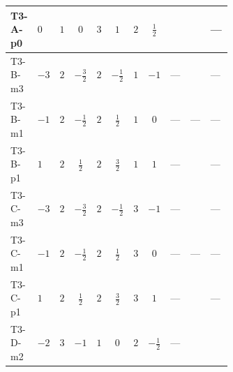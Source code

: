 \documentclass[8pt]{article}
\begin{document}
\begin{landscape}
\begin{longtable}{@{}llcccccc >{\raggedright\arraybackslash}p{0.21\linewidth} >{\raggedright\arraybackslash}p{0.21\linewidth} >{\raggedright\arraybackslash}p{0.21\linewidth}@{}}
\midrule
T3-A-p0 & $0$ & $1$ & $0$ & $3$ & $1$ & $2$ & $\frac{1}{2}$ & \scriptsize\adjustbox{max width=\linewidth}{$\begin{gathered} {m_1^2} (4 T_{\nu}^{(1)}+4 {\lambda_{S_1}^{(1)}})\end{gathered}$} & \scriptsize\adjustbox{max width=\linewidth}{$\begin{gathered} -8 \operatorname{Tr}\!\left({M_F}\,\left({M_F}\right)^{\dagger}\,\left({y_1}\right)^{T}\,\left({y_1}\right)^{*}\right)\end{gathered}$} & --- \\
\midrule
T3-B-m3 & $-3$ & $2$ & $-\frac{3}{2}$ & $2$ & $-\frac{1}{2}$ & $1$ & $-1$ & --- & \scriptsize\adjustbox{max width=\linewidth}{$\begin{gathered} -4 \operatorname{Tr}\!\left({M_F}\,\left({M_F}\right)^{\dagger}\,\left({y_1}\right)^{T}\,\left({y_1}\right)^{*}\right)\end{gathered}$} & --- \\
\midrule
T3-B-m1 & $-1$ & $2$ & $-\frac{1}{2}$ & $2$ & $\frac{1}{2}$ & $1$ & $0$ & --- & --- & --- \\
\midrule
T3-B-p1 & $1$ & $2$ & $\frac{1}{2}$ & $2$ & $\frac{3}{2}$ & $1$ & $1$ & --- & \scriptsize\adjustbox{max width=\linewidth}{$\begin{gathered} -4 \operatorname{Tr}\!\left({M_F}\,\left({M_F}\right)^{\dagger}\,\left({y_1}\right)^{T}\,\left({y_1}\right)^{*}\right)\end{gathered}$} & --- \\
\midrule
T3-C-m3 & $-3$ & $2$ & $-\frac{3}{2}$ & $2$ & $-\frac{1}{2}$ & $3$ & $-1$ & --- & \scriptsize\adjustbox{max width=\linewidth}{$\begin{gathered} -6 \operatorname{Tr}\!\left({M_F}\,\left({M_F}\right)^{\dagger}\,\left({y_1}\right)^{T}\,\left({y_1}\right)^{*}\right)\end{gathered}$} & --- \\
\midrule
T3-C-m1 & $-1$ & $2$ & $-\frac{1}{2}$ & $2$ & $\frac{1}{2}$ & $3$ & $0$ & --- & --- & --- \\
\midrule
T3-C-p1 & $1$ & $2$ & $\frac{1}{2}$ & $2$ & $\frac{3}{2}$ & $3$ & $1$ & --- & \scriptsize\adjustbox{max width=\linewidth}{$\begin{gathered} -6 \operatorname{Tr}\!\left({M_F}\,\left({M_F}\right)^{\dagger}\,\left({y_1}\right)^{T}\,\left({y_1}\right)^{*}\right)\end{gathered}$} & --- \\
\midrule
T3-D-m2 & $-2$ & $3$ & $-1$ & $1$ & $0$ & $2$ & $-\frac{1}{2}$ & --- & \scriptsize\adjustbox{max width=\linewidth}{$\begin{gathered} -4 \operatorname{Tr}\!\left({M_F}\,\left({M_F}\right)^{\dagger}\,\left({y_1}\right)^{T}\,\left({y_1}\right)^{*}\right)\end{gathered}$} & \scriptsize\adjustbox{max width=\linewidth}{$\begin{gathered} -6 {g_1}^2 {m_1^2}\end{gathered}$} \\

\end{longtable}
\end{landscape}
\end{document}
